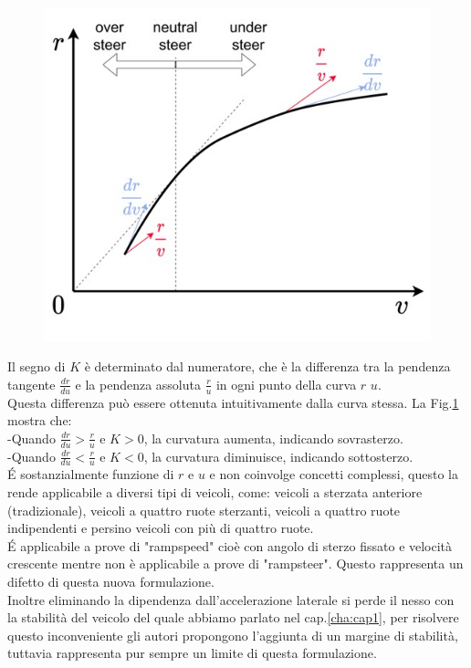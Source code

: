\begin{figure}[!h]
    \centering
    \includegraphics[scale=0.6]{Immagini/Understeer Gradient/K_cinesi.jpg}
    \caption{}
    \label{fig:K_cinesi}
\end{figure}
Il segno di $K$ è determinato dal numeratore, che è la differenza tra la pendenza tangente $\frac{dr}
{du}$ e la pendenza assoluta $\frac{r}{u}$ in ogni punto della curva $r$  $u$.\\ 
Questa differenza può essere ottenuta intuitivamente dalla curva stessa. La Fig.\ref{fig:K_cinesi} 
mostra che:\\ 
-Quando $\frac{dr}{du} > \frac{r}{u}$ e $K > 0$, la curvatura aumenta, indicando sovrasterzo.\\ 
-Quando $\frac{dr}{du} < \frac{r}{u}$ e $K < 0$, la curvatura diminuisce, indicando sottosterzo.\\
\'E sostanzialmente funzione di $r$ e $u$ e non coinvolge concetti complessi, questo la rende 
applicabile a diversi tipi di veicoli, come: veicoli a sterzata anteriore (tradizionale), veicoli a
quattro ruote sterzanti, veicoli a quattro ruote indipendenti e persino veicoli con più di quattro
ruote.\\ 
\'E applicabile a prove di "rampspeed" cioè con angolo di sterzo fissato e velocità crescente mentre
non è applicabile a prove di "rampsteer".
Questo rappresenta un difetto di questa nuova formulazione.\\
Inoltre eliminando la dipendenza dall'accelerazione laterale si perde il nesso con la stabilità del
veicolo del quale abbiamo parlato nel cap.\ref{cha:cap1}, per risolvere questo inconveniente gli
autori propongono l'aggiunta di un margine di stabilità, tuttavia rappresenta pur sempre un limite
di questa formulazione.


